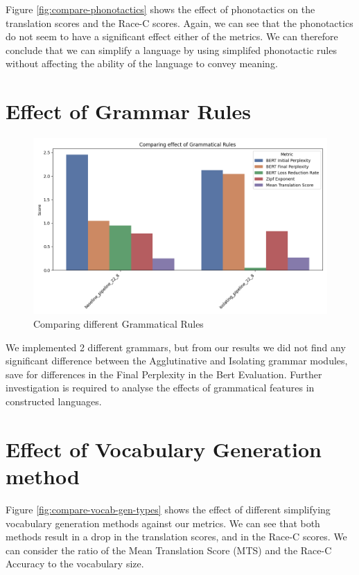 Figure \ref{fig:compare-phonotactics} shows the effect of phonotactics on the translation scores and the Race-C scores. Again, we can see that
the phonotactics do not seem to have a significant effect either of the metrics. We can therefore conclude that we can simplify a language by 
using simplifed phonotactic rules without affecting the ability of the language to convey meaning.

\section{Effect of Grammar Rules}

\begin{figure}[H]  
    \centering
    \includegraphics[width=0.7\linewidth]{figures/results/1_effect_of_grammar.png}
    \caption{Comparing different Grammatical Rules}
    \label{fig:compare-grammar}
\end{figure}

We implemented 2 different grammars, but from our results we did not find any significant difference between the Agglutinative and Isolating 
grammar modules, save for differences in the Final Perplexity in the Bert Evaluation. Further investigation is required to analyse the effects
of grammatical features in constructed languages.

\section{Effect of Vocabulary Generation method}

Figure \ref{fig:compare-vocab-gen-types} shows the effect of different simplifying vocabulary generation methods against our metrics.
We can see that both methods result in a drop in the translation scores, and in the Race-C scores. We can consider the ratio of the Mean Translation Score (MTS) and 
the Race-C Accuracy to the vocabulary size.

